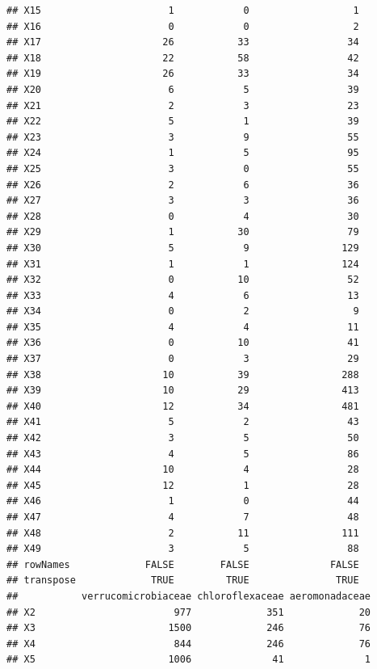 \documentclass[12pt]{beamer}\usepackage[]{graphicx}\usepackage[]{color}
\makeatletter
\newenvironment{kframe}{%
 \def\at@end@of@kframe{}%
 \ifinner\ifhmode%
  \def\at@end@of@kframe{\end{minipage}}%
  \begin{minipage}{\columnwidth}%
 \fi\fi%
 \def\FrameCommand##1{\hskip\@totalleftmargin \hskip-\fboxsep
 \colorbox{shadecolor}{##1}\hskip-\fboxsep
     \hskip-\linewidth \hskip-\@totalleftmargin \hskip\columnwidth}%
 \MakeFramed {\advance\hsize-\width
   \@totalleftmargin\z@ \linewidth\hsize
   \@setminipage}}%
 {\par\unskip\endMakeFramed%
 \at@end@of@kframe}
\newenvironment{knitrout}{}{} %
\makeatother
\begin{document}
\begin{frame}[fragile]
\begin{knitrout}
\begin{kframe}
\begin{verbatim}
## X15                      1            0                  1
## X16                      0            0                  2
## X17                     26           33                 34
## X18                     22           58                 42
## X19                     26           33                 34
## X20                      6            5                 39
## X21                      2            3                 23
## X22                      5            1                 39
## X23                      3            9                 55
## X24                      1            5                 95
## X25                      3            0                 55
## X26                      2            6                 36
## X27                      3            3                 36
## X28                      0            4                 30
## X29                      1           30                 79
## X30                      5            9                129
## X31                      1            1                124
## X32                      0           10                 52
## X33                      4            6                 13
## X34                      0            2                  9
## X35                      4            4                 11
## X36                      0           10                 41
## X37                      0            3                 29
## X38                     10           39                288
## X39                     10           29                413
## X40                     12           34                481
## X41                      5            2                 43
## X42                      3            5                 50
## X43                      4            5                 86
## X44                     10            4                 28
## X45                     12            1                 28
## X46                      1            0                 44
## X47                      4            7                 48
## X48                      2           11                111
## X49                      3            5                 88
## rowNames             FALSE        FALSE              FALSE
## transpose             TRUE         TRUE               TRUE
##           verrucomicrobiaceae chloroflexaceae aeromonadaceae
## X2                        977             351             20
## X3                       1500             246             76
## X4                        844             246             76
## X5                       1006              41              1

\end{verbatim}
\end{kframe}
\end{knitrout}
\end{frame}
\end{document}
